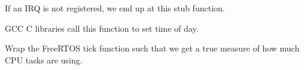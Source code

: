 \subsubsection[{\texorpdfstring{\+\_\+\+\_\+attribute\+\_\+\+\_\+}{__attribute__}}]{}\hypertarget{group__CMSIS__CM3__NVIC_ga8c1dfc1ccf00a08192611433ee7f17b4}{}\label{group__CMSIS__CM3__NVIC_ga8c1dfc1ccf00a08192611433ee7f17b4}


If an I\+RQ is not registered, we end up at this stub function. 

G\+CC C libraries call this function to set time of day.

Wrap the Free\+R\+T\+OS tick function such that we get a true measure of how much C\+PU tasks are using. 